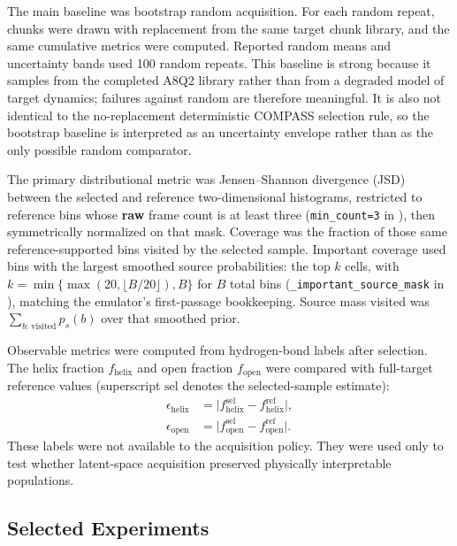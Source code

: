 \documentclass[journal=jctcce,manuscript=article,layout=twocolumn]{achemso}
\begin{document}
The main baseline was bootstrap random acquisition. For each random repeat, chunks were drawn with replacement from the same target chunk library, and the same cumulative metrics were computed. Reported random means and uncertainty bands used 100 random repeats. This baseline is strong because it samples from the completed A8Q2 library rather than from a degraded model of target dynamics; failures against random are therefore meaningful. It is also not identical to the no-replacement deterministic COMPASS selection rule, so the bootstrap baseline is interpreted as an uncertainty envelope rather than as the only possible random comparator.

The primary distributional metric was Jensen--Shannon divergence (JSD) between the selected and reference two-dimensional histograms, restricted to reference bins whose \textbf{raw} frame count is at least three (\texttt{min\_count=3} in ), then symmetrically normalized on that mask. Coverage was the fraction of those same reference-supported bins visited by the selected sample. Important coverage used bins with the largest smoothed source probabilities: the top $k$ cells, with $k=\min\{\max(20,\lfloor B/20\rfloor),B\}$ for $B$ total bins (\texttt{\_important\_source\_mask} in ), matching the emulator's first-passage bookkeeping. Source mass visited was $\sum_{b:\,\mathrm{visited}} p_s(b)$ over that smoothed prior.

Observable metrics were computed from hydrogen-bond labels after selection. The helix fraction \(f_{\mathrm{helix}}\) and open fraction \(f_{\mathrm{open}}\) were compared with full-target reference values (superscript $\text{sel}$ denotes the selected-sample estimate):
\begin{equation}
\begin{split}
    \epsilon_{\mathrm{helix}} &= \bigl| f_{\mathrm{helix}}^{\text{sel}} - f_{\mathrm{helix}}^{\mathrm{ref}} \bigr|,\\
    \epsilon_{\mathrm{open}} &= \bigl| f_{\mathrm{open}}^{\text{sel}} - f_{\mathrm{open}}^{\mathrm{ref}} \bigr|.
\end{split}
\end{equation}
These labels were not available to the acquisition policy. They were used only to test whether latent-space acquisition preserved physically interpretable populations.

\subsection{Selected Experiments}
\end{document}
